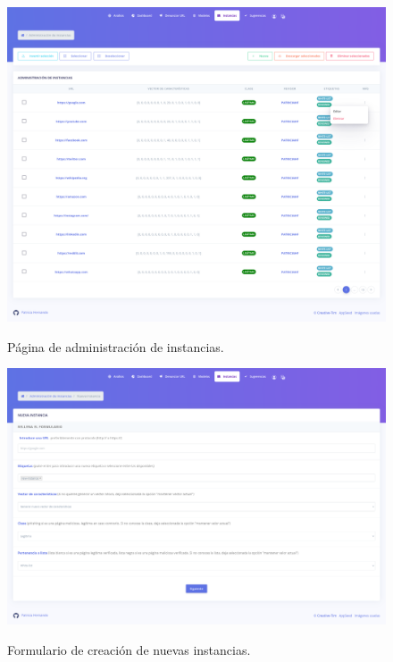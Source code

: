 \begin{figure}[h]
	\caption[Manual de usuario: página de instancias]{Página de administración de instancias.}
	\centering
	\includegraphics[width=\textwidth]{../img/anexos/user_guide/6_instances}
	\label{e-5:instances}
\end{figure}

\begin{figure}[h]
	\caption[Manual de usuario: nueva instancia]{Formulario de creación de nuevas instancias.}
	\centering
	\includegraphics[width=\textwidth]{../img/anexos/user_guide/6_new_instance}
	\label{e-5:new-instance}
\end{figure}

